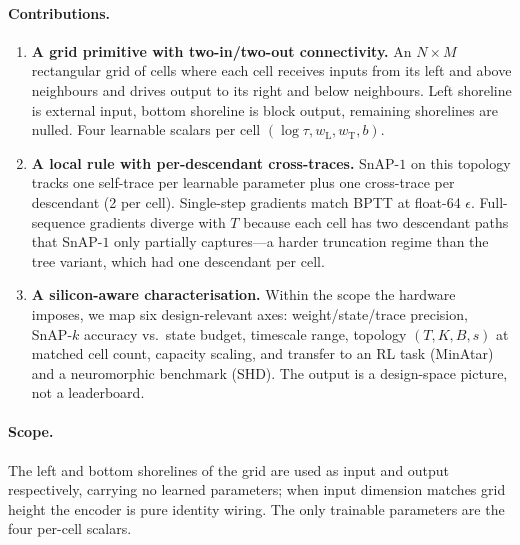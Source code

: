 \documentclass[11pt]{article}
\begin{document}
\paragraph{Contributions.}
\begin{enumerate}[leftmargin=*]
\item \textbf{A grid primitive with two-in/two-out connectivity.} An
$N{\times}M$ rectangular grid of cells where each cell receives inputs
from its left and above neighbours and drives output to its right and
below neighbours. Left shoreline is external input, bottom shoreline
is block output, remaining shorelines are nulled. Four learnable
scalars per cell $(\log\tau, w_\text{L}, w_\text{T}, b)$.
\item \textbf{A local rule with per-descendant cross-traces.} SnAP-$1$
on this topology tracks one self-trace per learnable parameter plus
one cross-trace per descendant (2 per cell). Single-step gradients
match BPTT at float-64 $\epsilon$. Full-sequence gradients diverge
with $T$ because each cell has two descendant paths that SnAP-$1$ only
partially captures---a harder truncation regime than the tree variant,
which had one descendant per cell.
\item \textbf{A silicon-aware characterisation.} Within the scope the
hardware imposes, we map six design-relevant axes: weight/state/trace
precision, SnAP-$k$ accuracy vs.\ state budget, timescale range,
topology $(T, K, B, s)$ at matched cell count, capacity scaling, and
transfer to an RL task (MinAtar) and a neuromorphic benchmark (SHD).
The output is a design-space picture, not a leaderboard.
\end{enumerate}

\paragraph{Scope.}
The left and bottom shorelines of the grid are used as input and
output respectively, carrying no learned parameters; when input
dimension matches grid height the encoder is pure identity wiring.
The only trainable parameters are the four per-cell scalars.
\end{document}
